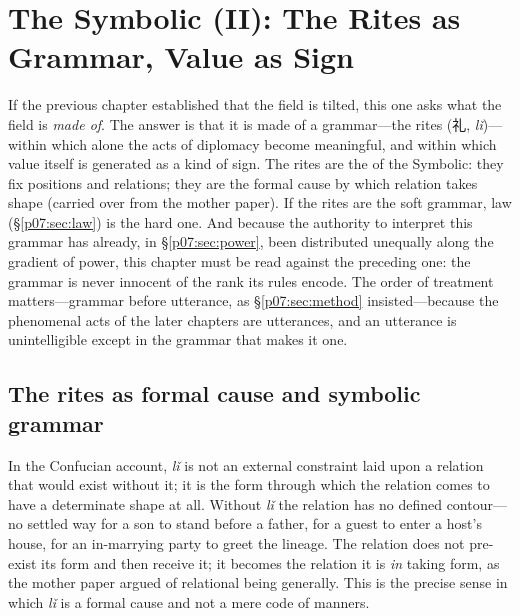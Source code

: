 \documentclass[11pt,a4paper]{article}
\newcommand{\zh}[1]{{\cjk #1}}
\newcommand{\emb}[1]{\textcolor{rose}{\oldtextbf{#1}}}
\newcommand{\xref}[1]{\textcolor{rose}{\S\ref{#1}}}
\begin{document}
\section{The Symbolic (II): The Rites as Grammar, Value as Sign}\label{p07:sec:rite}

If the previous chapter established that the field is tilted, this one asks what the field is \emph{made of}. The answer is that it is made of a grammar---the rites (\zh{礼}, \emph{lǐ})---within which alone the acts of diplomacy become meaningful, and within which value itself is generated as a kind of sign. The rites are the \emb{grammar} of the Symbolic: they fix positions and relations; they are the formal cause by which relation takes shape (carried over from the mother paper). If the rites are the soft grammar, law (\xref{p07:sec:law}) is the hard one. And because the authority to interpret this grammar has already, in \xref{p07:sec:power}, been distributed unequally along the gradient of power, this chapter must be read against the preceding one: the grammar is never innocent of the rank its rules encode. The order of treatment matters---grammar before utterance, as \xref{p07:sec:method} insisted---because the phenomenal acts of the later chapters are utterances, and an utterance is unintelligible except in the grammar that makes it one.

\subsection{The rites as formal cause and symbolic grammar}
In the Confucian account, \emph{lǐ} is not an external constraint laid upon a relation that would exist without it; it is the form through which the relation comes to have a determinate shape at all. Without \emph{lǐ} the relation has no defined contour---no settled way for a son to stand before a father, for a guest to enter a host's house, for an in-marrying party to greet the lineage. The relation does not pre-exist its form and then receive it; it becomes the relation it is \emph{in} taking form, as the mother paper argued of relational being generally. This is the precise sense in which \emph{lǐ} is a formal cause and not a mere code of manners.
\end{document}
